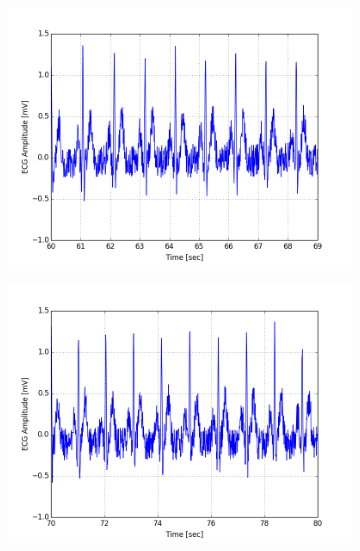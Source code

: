 \documentclass[paper=a4, fontsize=11pt]{scrartcl}
\numberwithin{equation}{section}		%
\numberwithin{figure}{section}			%
\numberwithin{table}{section}		    %
\begin{document}
\begin{appendices}
\begin{figure}[H]
	\centering
	\begin{subfigure}[b]{0.3\textwidth}
		\includegraphics[width=\textwidth]{sim/ecg_7}
	\end{subfigure}
	\begin{subfigure}[b]{0.3\textwidth}
		\includegraphics[width=\textwidth]{sim/ecg_8}
	\end{subfigure}
	\begin{subfigure}[b]{0.3\textwidth}

\end{subfigure}
\end{figure}
\end{appendices}
\end{document}
